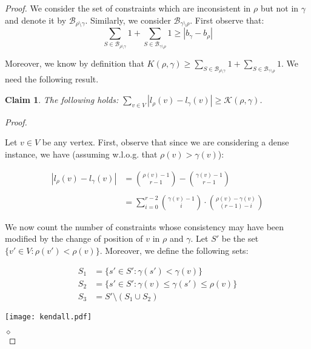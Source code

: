 \documentclass[11pt]{article}
\newtheorem{claim}[theorem]{Claim}
\newenvironment{proofclaim}{
	\noindent \emph{Proof.}
}{\hfill $\diamond$ \\
}
\begin{document}
\begin{proof}
We consider the set of constraints which are inconsistent in $\rho$ but not in $\gamma$ and denote it by $\mathcal{B}_{\rho \setminus \gamma}$. Similarly, we consider $\mathcal{B}_{\gamma \setminus \rho}$. First observe that:
$$\displaystyle\sum_{S \in \mathcal{B}_{\rho \setminus \gamma}} 1 + \displaystyle\sum_{S \in \mathcal{B}_{\gamma \setminus \rho}} 1 \geqslant |b_\gamma - b_\rho|$$

Moreover, we know by definition that $K(\rho, \gamma) \geqslant \displaystyle\sum_{S \in \mathcal{B}_{\rho \setminus \gamma}} 1 + \displaystyle\sum_{S \in \mathcal{B}_{\gamma \setminus \rho}} 1$. We need the following result. 

\begin{claim}
\label{claim:tau}
	The following holds: $\displaystyle{\displaystyle\sum_{v \in V}} |l_\rho(v) - l_\gamma(v)| \geqslant \mathcal{K}(\rho, \gamma) $. 

\end{claim}

\begin{proofclaim}
	Let $v \in V$ be any vertex. First, observe that since we are considering a dense instance, we have (assuming w.l.o.g. that $\rho(v) > \gamma(v)$): 
	
	$$
		\begin{array}{ll}
		|l_\rho(v) - l_\gamma(v)| & = \displaystyle { \rho(v) - 1 \choose r - 1 } -  { \gamma(v) -1 \choose r - 1 }  \\ 
		& \\
								  & = \displaystyle\sum_{i=0}^{r-2}  { \gamma(v) - 1 \choose i }  \cdot { \rho(v) - \gamma(v) \choose (r - 1) - i } 
								  \end{array}
	$$
	
	We now count the number of constraints whose consistency may have been modified by the change of position of $v$ in $\rho$ and $\gamma$. Let $S'$ be the set $\{v' \in V : \rho(v') < \rho(v)\}$. Moreover, we define the following sets: 
	
\begin{minipage}{0.4 \linewidth}
	$$
		\begin{array}{ll}
		S_1 & = \{ s' \in S' : \gamma(s') < \gamma(v) \} \\
		S_2 & = \{ s' \in S' : \gamma(v) \leqslant \gamma(s') \leqslant \rho(v) \} \\
		S_3 & = S' \setminus (S_1 \cup S_2)
	\end{array}
	$$
	\end{minipage}
	\begin{minipage}{0.6 \linewidth}
		\centerline{\texttt{[image: kendall.pdf]}}
		\label{fig:kendall}
	\end{minipage}
	\vspace{0.4cm}
	

\end{proofclaim}
\end{proof}
\end{document}
